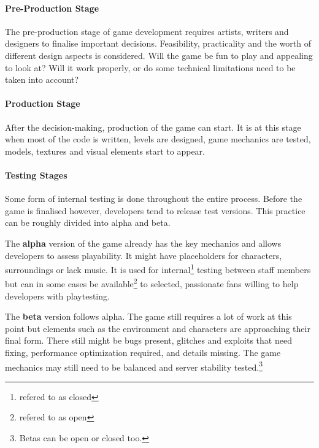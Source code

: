 \paragraph{Pre-Production Stage}
The pre-production stage of game development requires artists, writers and designers to finalise important decisions. Feasibility, practicality and the worth of different design aspects is considered. Will the game be fun to play and appealing to look at? Will it work properly, or do some technical limitations need to be taken into account?
\cite{bramble_7-stages, rocket_6-stages}

\paragraph{Production Stage}
After the decision-making, production of the game can start. It is at this stage when most of the code is written, levels are designed, game mechanics are tested, models, textures and visual elements start to appear.
\cite{bramble_7-stages, rocket_6-stages}

\paragraph{Testing Stages}
Some form of internal testing is done throughout the entire process. Before the game is finalised however, developers tend to release test versions. This practice can be roughly divided into alpha and beta.

The \textbf{alpha} version of the game already has the key mechanics and allows developers to assess playability. It might have placeholders for characters, surroundings or lack music. It is used for internal\footnote{refered to as closed} testing between staff members but can in some cases be available\footnote{refered to as open} to selected, passionate fans willing to help developers with playtesting.

The \textbf{beta} version follows alpha. The game still requires a lot of work at this point but elements such as the environment and characters are approaching their final form. There still might be bugs present, glitches and exploits that need fixing, performance optimization required, and details missing. The game mechanics may still need to be balanced and server stability tested.\footnote{Betas can be open or closed too.}
\cite{bramble_7-stages, rocket_6-stages, esler_viable-games}

